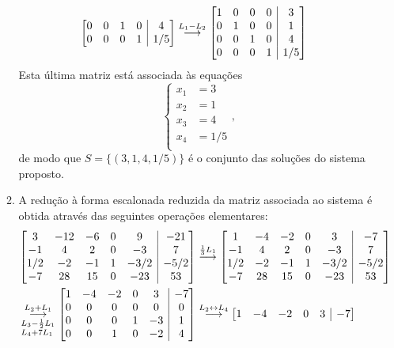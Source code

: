 \documentclass[12pt,a4paper]{article}
\makeatletter
\newenvironment{amatrix}[1]{%
  \left[\begin{array}{@{}*{#1}{c}|c@{}}
}{%
  \end{array}\right]
}
\newcommand{\grstep}[2][\relax]{%
   \ensuremath{\mathrel{
       {\mathop{\longrightarrow}\limits^{#2\mathstrut}_{
                                     \begin{subarray}{l} #1 \end{subarray}}}}}}
\makeatother
\begin{document}
\begin{enumerate}
\begin{enumerate}
\begin{align*}
\begin{amatrix}{4}
0 & 0 & 1 & 0 & 4 \\
0 & 0 & 0 & 1 & 1/5
\end{amatrix}
&
\grstep{ L_1 - L_2 }
\begin{amatrix}{4}
1 & 0 & 0 & 0 & 3 \\
0 & 1 & 0 & 0 & 1 \\
0 & 0 & 1 & 0 & 4 \\
0 & 0 & 0 & 1 & 1/5
\end{amatrix}
\end{align*}
Esta última matriz está associada às equações
\[
\left\{
\begin{aligned}
x_1 & = 3 \\
x_2 & = 1 \\
x_3 & = 4 \\
x_4 & = 1/5 \\
\end{aligned}
\right.,
\]
de modo que $S = \{ ( 3, 1, 4, 1/5 ) \}$ é o conjunto das soluções do sistema proposto.
\item A redução à forma escalonada reduzida da matriz associada ao sistema é obtida através das seguintes operações elementares:\begin{align*}
\begin{amatrix}{5}
   3 & -12 & -6 & 0 &    9 & -21 \\
   -1 &   4 &  2 & 0 &   -3 &  7 \\
1/2 &  -2 & -1 & 1 & -3/2 & -5/2 \\
   -7 &  28 & 15 & 0 & -23  & 53
\end{amatrix}
&
\grstep{ \frac{1}{3} L_1 }
\begin{amatrix}{5}
   1 & -4 & -2 &  0 &   3 & -7 \\
   -1 &  4 &  2 & 0 &  -3 &   7 \\
1/2 & -2 & -1 & 1 & -3/2 & -5/2 \\
   -7 & 28 & 15 & 0 & -23 & 53
\end{amatrix} \\
\grstep[ L_3 - \frac{1}{2} L_1 \\ L_4 + 7 L_1 ]{ L_2 + L_1 }
\begin{amatrix}{5}
1 & -4 & -2 &   0 &  3 & -7 \\
0 &  0 &  0 &   0 &  0 &  0 \\
0 &  0 &  0 &   1 & -3 & 1 \\
0 &  0 &  1 &   0 & -2 & 4
\end{amatrix}
&
\grstep{ L_2 \leftrightarrow L_4 }
\begin{amatrix}{5}
1 & -4 & -2 &   0 &  3 & -7 \\

\end{amatrix}
\end{align*}
\end{enumerate}
\end{enumerate}
\end{document}
